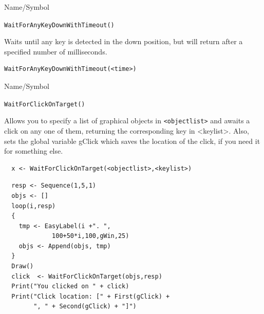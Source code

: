 \begin{desc}{Name/Symbol}
\item[Name/Symbol]  	\verb+WaitForAnyKeyDownWithTimeout()+

\item[Description] Waits until any key is detected in the down position, but will return
  after a specified number of milliseconds.

\item[Usage]
\begin{verbatim}
WaitForAnyKeyDownWithTimeout(<time>)
\end{verbatim}

\item[Example]	

\item[See Also]	
\end{desc}



\begin{desc}{Name/Symbol}
\item[Name/Symbol]  	\verb+WaitForClickOnTarget()+

\item[Description]	
  Allows you to specify a list of graphical objects in \verb+<objectlist>+ and awaits a click
  on any one of them, returning the corresponding key in <keylist>.  Also, sets the 
  global variable gClick which saves the location of the click, if 
  you need it for something else.
\item[Usage]		
\begin{verbatim}
  x <- WaitForClickOnTarget(<objectlist>,<keylist>)
\end{verbatim}

\item[Example]	

\begin{verbatim}
  resp <- Sequence(1,5,1)
  objs <- []
  loop(i,resp)
  {
    tmp <- EasyLabel(i +". ",
             100+50*i,100,gWin,25)
    objs <- Append(objs, tmp)
  }
  Draw()
  click  <- WaitForClickOnTarget(objs,resp)
  Print("You clicked on " + click)
  Print("Click location: [" + First(gClick) + 
        ", " + Second(gClick) + "]")
\end{verbatim}
\item[See Also]	
\end{desc}




